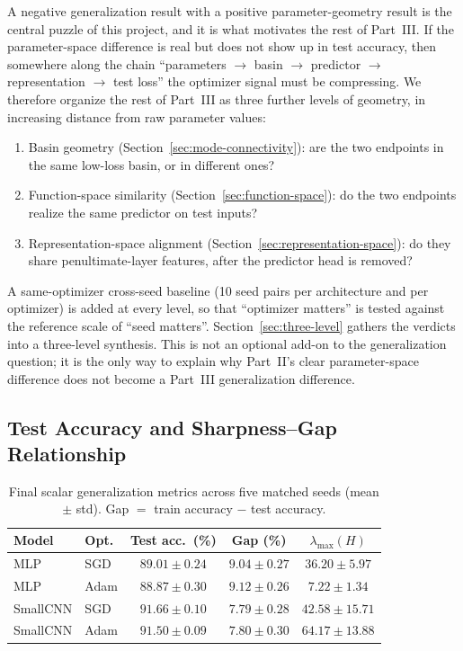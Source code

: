 \documentclass[11pt]{article}
\begin{document}
A negative generalization result with a positive parameter-geometry result is the central puzzle of this project, and it is what motivates the rest of Part~III. If the parameter-space difference is real but does not show up in test accuracy, then somewhere along the chain ``parameters $\to$ basin $\to$ predictor $\to$ representation $\to$ test loss'' the optimizer signal must be compressing. We therefore organize the rest of Part~III as three further levels of geometry, in increasing distance from raw parameter values:
\begin{enumerate}
\item Basin geometry (Section~\ref{sec:mode-connectivity}): are the two endpoints in the same low-loss basin, or in different ones?
\item Function-space similarity (Section~\ref{sec:function-space}): do the two endpoints realize the same predictor on test inputs?
\item Representation-space alignment (Section~\ref{sec:representation-space}): do they share penultimate-layer features, after the predictor head is removed?
\end{enumerate}
A same-optimizer cross-seed baseline (10 seed pairs per architecture and per optimizer) is added at every level, so that ``optimizer matters'' is tested against the reference scale of ``seed matters''. Section~\ref{sec:three-level} gathers the verdicts into a three-level synthesis. This is not an optional add-on to the generalization question; it is the only way to explain why Part~II's clear parameter-space difference does not become a Part~III generalization difference.

\subsection{Test Accuracy and Sharpness--Gap Relationship}

\begin{table}[H]
\centering
\caption{Final scalar generalization metrics across five matched seeds (mean $\pm$ std). Gap $=$ train accuracy $-$ test accuracy.}
\label{tab:part3-scalar}
\small
\setlength{\tabcolsep}{5pt}
\begin{tabular}{llccc}
\toprule
Model    & Opt. & Test acc.\ (\%)     & Gap (\%)           & $\lambda_{\max}(H)$ \\
\midrule
MLP      & SGD  & $89.01 \pm 0.24$   & $9.04 \pm 0.27$    & $36.20 \pm 5.97$  \\
MLP      & Adam & $88.87 \pm 0.30$   & $9.12 \pm 0.26$    & $7.22  \pm 1.34$  \\
SmallCNN & SGD  & $91.66 \pm 0.10$   & $7.79 \pm 0.28$    & $42.58 \pm 15.71$ \\
SmallCNN & Adam & $91.50 \pm 0.09$   & $7.80 \pm 0.30$    & $64.17 \pm 13.88$ \\
\bottomrule
\end{tabular}
\end{table}
\end{document}
